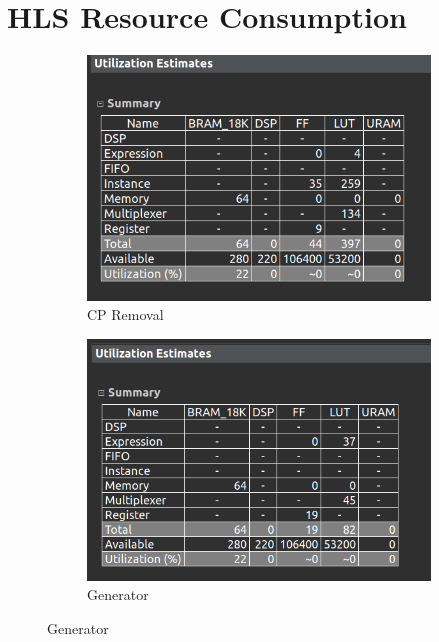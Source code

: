 \documentclass{article}
\begin{document}
\section{HLS Resource Consumption}
\vspace{1cm}
\begin{figure}[h]
\centering
\begin{subfigure}{0.6\textwidth}
    \centering
\includegraphics[width=\textwidth]{figs/cpr1.png}
    \caption{CP Removal}
    \label{fig:my_label}
\end{subfigure}
\hfill
\begin{subfigure}{0.6\textwidth}
    \centering
\includegraphics[width=\textwidth]{figs/gen1.png}
    \caption{Generator}
    \label{fig:my_label}
\end{subfigure}
\end{figure}
\end{document}
